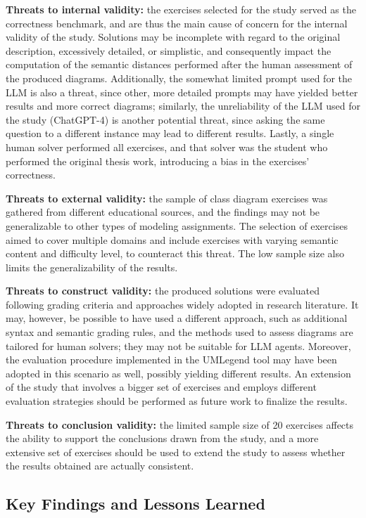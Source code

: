 \textbf{Threats to internal validity:} the exercises selected for the study served as the correctness benchmark, and are thus the main cause of concern for the internal validity of the study. Solutions may be incomplete with regard to the original description, excessively detailed, or simplistic, and consequently impact the computation of the semantic distances performed after the human assessment of the produced diagrams. Additionally, the somewhat limited prompt used for the LLM is also a threat, since other, more detailed prompts may have yielded better results and more correct diagrams; similarly, the unreliability of the LLM used for the study (ChatGPT-4) is another potential threat, since asking the same question to a different instance may lead to different results. Lastly, a single human solver performed all exercises, and that solver was the student who performed the original thesis work, introducing a bias in the exercises' correctness.

\textbf{Threats to external validity:} the sample of class diagram exercises was gathered from different educational sources, and the findings may not be generalizable to other types of modeling assignments. The selection of exercises aimed to cover multiple domains and include exercises with varying semantic content and difficulty level, to counteract this threat. The low sample size also limits the generalizability of the results.

\textbf{Threats to construct validity:} the produced solutions were evaluated following grading criteria and approaches widely adopted in research literature. It may, however, be possible to have used a different approach, such as additional syntax and semantic grading rules, and the methods used to assess diagrams are tailored for human solvers; they may not be suitable for LLM agents. Moreover, the evaluation procedure implemented in the UMLegend tool may have been adopted in this scenario as well, possibly yielding different results. An extension of the study that involves a bigger set of exercises and employs different evaluation strategies should be performed as future work to finalize the results.

\textbf{Threats to conclusion validity:} the limited sample size of 20 exercises affects the ability to support the conclusions drawn from the study, and a more extensive set of exercises should be used to extend the study to assess whether the results obtained are actually consistent.


\subsection{Key Findings and Lessons Learned}
\label{sec:llm4mde:study1:discussion}

